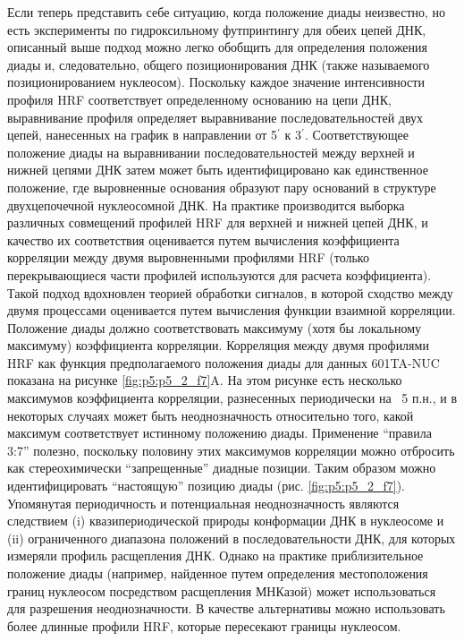 Если теперь представить себе ситуацию, когда положение диады неизвестно, но есть эксперименты по гидроксильному футпринтингу для обеих цепей ДНК, описанный выше подход можно легко обобщить для определения положения диады и, следовательно, общего позиционирования ДНК (также называемого позиционированием нуклеосом). Поскольку каждое значение интенсивности профиля HRF соответствует определенному основанию на цепи ДНК, выравнивание профиля определяет выравнивание последовательностей двух цепей, нанесенных на график в направлении от 5$^\prime$ к 3$^\prime$. Соответствующее положение диады на выравнивании последовательностей между верхней и нижней цепями ДНК затем может быть идентифицировано как единственное положение, где выровненные основания образуют пару оснований в структуре двухцепочечной нуклеосомной ДНК.
На практике производится выборка различных совмещений профилей HRF для верхней и нижней цепей ДНК, и качество их соответствия оценивается путем вычисления коэффициента корреляции между двумя выровненными профилями HRF (только перекрывающиеся части профилей используются для расчета коэффициента). Такой подход вдохновлен теорией обработки сигналов, в которой сходство между двумя процессами оценивается путем вычисления функции взаимной корреляции. Положение диады должно соответствовать максимуму (хотя бы локальному максимуму) коэффициента корреляции. Корреляция между двумя профилями HRF как функция предполагаемого положения диады для данных 601TA-NUC показана на рисунке \ref{fig:p5:p5_2_f7}A. На этом рисунке есть несколько максимумов коэффициента корреляции, разнесенных периодически на ~5 п.н., и в некоторых случаях может быть неоднозначность относительно того, какой максимум соответствует истинному положению диады. Применение ``правила 3:7'' полезно, поскольку половину этих максимумов корреляции можно отбросить как стереохимически ``запрещенные'' диадные позиции. Таким образом можно идентифицировать ``настоящую'' позицию диады (рис.  \ref{fig:p5:p5_2_f7}). Упомянутая периодичность и потенциальная неоднозначность являются следствием (i) квазипериодической природы конформации ДНК в нуклеосоме и (ii) ограниченного диапазона положений в последовательности ДНК, для которых измеряли профиль расщепления ДНК. Однако на практике приблизительное положение диады (например, найденное путем определения местоположения границ нуклеосом посредством расщепления МНКазой) может использоваться для разрешения неоднозначности. В качестве альтернативы можно использовать более длинные профили HRF, которые пересекают границы нуклеосом.
